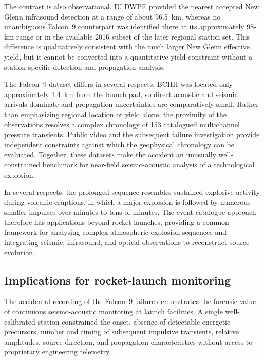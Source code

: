 \documentclass[]{seismica}
\begin{document}
The contrast is also observational. IU.DWPF provided the nearest accepted New
Glenn infrasound detection at a range of about 96.5~km, whereas no unambiguous
Falcon~9 counterpart was identified there at its approximately 98-km range or
in the available 2016 subset of the later regional station set. This difference
is qualitatively consistent with the much larger New Glenn effective yield,
but it cannot be converted into a quantitative yield constraint without a
station-specific detection and propagation analysis.

The Falcon~9 dataset differs in several respects. BCHH was located only
approximately 1.4~km from the launch pad, so direct acoustic and seismic
arrivals dominate and propagation uncertainties are comparatively small.
Rather than emphasizing regional location or yield alone, the proximity of the
observations resolves a complex chronology of 153 catalogued multichannel
pressure transients. Public video and the subsequent failure investigation
provide independent constraints against which the geophysical chronology can
be evaluated. Together, these datasets make the accident an unusually
well-constrained benchmark for near-field seismo-acoustic analysis of a
technological explosion.

In several respects, the prolonged sequence resembles sustained explosive activity during volcanic eruptions, in which a major explosion is followed by numerous smaller impulses over minutes to tens of minutes. The event-catalogue approach therefore has applications beyond rocket launches, providing a common framework for analysing complex atmospheric explosion sequences and integrating seismic, infrasound, and optical observations to reconstruct source evolution.

\subsection{Implications for rocket-launch monitoring}
\label{sec:discussion_monitoring}

The accidental recording of the Falcon~9 failure demonstrates the forensic
value of continuous seismo-acoustic monitoring at launch facilities. A single
well-calibrated station constrained the onset, absence of detectable energetic
precursors, number and timing of subsequent impulsive transients, relative
amplitudes, source direction, and propagation characteristics without access to
proprietary engineering telemetry.
\end{document}
